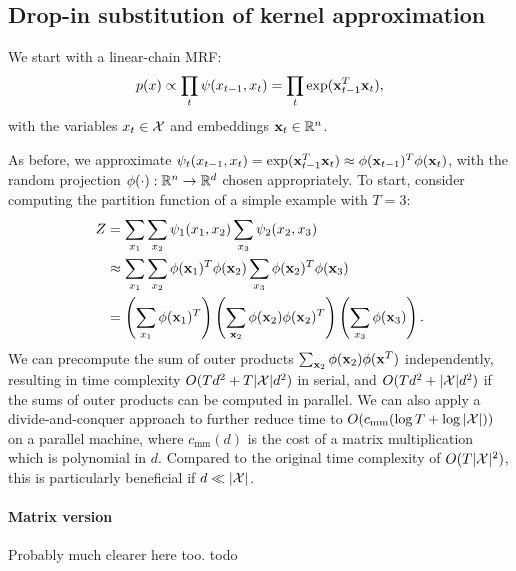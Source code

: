 \documentclass{article}
\begin{document}
\subsection{Drop-in substitution of kernel approximation}
We start with a linear-chain MRF:
$$p(x) \propto \prod_t \psi(x_{t-1},x_t) = \prod_t \exp(\mathbf{x}_{t-1}^T\mathbf{x}_t),$$
with the variables $x_t\in\mathcal{X}$ and embeddings $\mathbf{x}_t\in\mathbb{R}^n$.
\begin{comment}
\begin{figure}[h]
\centering
\begin{tikzpicture}
\node[latent] (x1) {$x_1$};
\node[latent, right=of x1] (x2) {$x_2$};
\node[latent, right=of x2] (x3) {$x_3$};
\factor[right=of x1] {f1} {$\psi(x_1,x_2)$} {} {};
\factor[right=of x2] {f2} {$\psi(x_2,x_3)$} {} {};
\factoredge {x1,x2} {f1} {};
\factoredge {x2,x3} {f2} {};
\end{tikzpicture}
\caption{
\label{fig:linear-chain}
}
\end{figure}
\end{comment}
As before, we approximate
$\psi_t(x_{t-1}, x_t) = \exp(\mathbf{x}_{t-1}^T \mathbf{x}_t) \approx \phi(\mathbf{x}_{t-1})^T\phi(\mathbf{x}_t)$,
with the random projection $\phi(\cdot): \mathbb{R}^n \to \mathbb{R}^d$ chosen appropriately.
To start, consider computing the partition function of a simple example with $T=3$:
\begin{equation}
\begin{aligned}
Z
&= \sum_{x_1}\sum_{x_2} \psi_1(x_1, x_2) \sum_{x_3} \psi_2(x_2, x_3) \\
&\approx \sum_{x_1}\sum_{x_2} \phi(\mathbf{x}_1)^T\phi(\mathbf{x}_2) \sum_{x_3} \phi(\mathbf{x}_2)^T\phi(\mathbf{x}_3)\\
&= \left(\sum_{x_1} \phi(\mathbf{x}_1)^T\right) \left(\sum_{\mathbf{x}_2} \phi(\mathbf{x}_2)\phi(\mathbf{x}_2)^T\right)
    \left(\sum_{x_3}\phi(\mathbf{x}_3)\right).
\end{aligned}
\end{equation}
We can precompute the sum of outer products $\sum_{\mathbf{x}_2}\phi(\mathbf{x}_2)\phi(\mathbf{x}^T)$ independently,
resulting in time complexity $O(Td^2 + T|\mathcal{X}|d^2)$ in serial,
and $O(Td^2 + |\mathcal{X}|d^2)$ if the sums of outer products can be computed in parallel.
We can also apply a divide-and-conquer approach to further
reduce time to $O(c_{\textrm{mm}}(\log T + \log |\mathcal{X}|))$ on a parallel machine,
where $c_{\textrm{mm}}(d)$ is the cost of a matrix multiplication which is polynomial in $d$.
Compared to the original time complexity of $O(T|\mathcal{X}|^2)$,
this is particularly beneficial if $d \ll |\mathcal{X}|$.

\paragraph{Matrix version}
Probably much clearer here too.
todo
\end{document}
